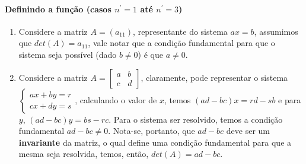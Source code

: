 \documentclass[12pt]{article}
\begin{document}
\paragraph{Definindo a função (casos $n^\prime = 1$ até $n^\prime = 3$)}
\begin{enumerate}
	\item Considere a matriz $A = (a_{11})$, representante do sistema $ax=b$, assumimos que $det(A) = a_{11}$, vale notar que a condição fundamental para que o sistema seja possível (dado $b\neq 0$) é que $a \neq 0$.
	
	\item Considere a matriz $A = \begin{bmatrix} a & b \\ c & d \end{bmatrix}$, claramente, pode representar o 
sistema $\begin{cases} ax + by = r \\ cx + dy = s \end{cases}$, calculando o valor de $x$, temos
$(ad - bc)x = rd - sb$ e para $y$, $(ad - bc)y = bs - rc$. Para o sistema ser resolvido, temos a condição fundamental
$ad-bc \neq 0$. Nota-se, portanto, que $ad - bc$ deve ser um \textbf{invariante} da matriz, o qual define uma condição fundamental para que a mesma seja resolvida, temos, então, $det(A) = ad - bc$.


\end{enumerate}
\end{document}

